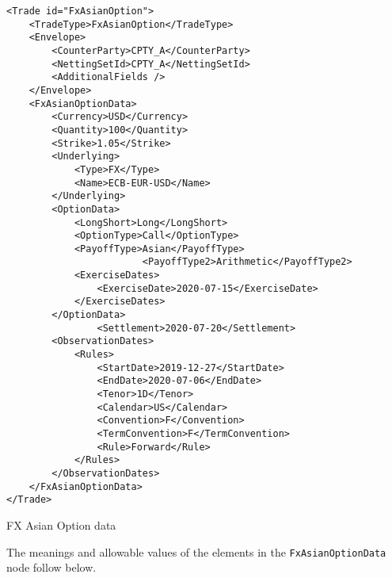 \begin{listing}[H]
	\begin{verbatim}
<Trade id="FxAsianOption">
	<TradeType>FxAsianOption</TradeType>
	<Envelope>
		<CounterParty>CPTY_A</CounterParty>
		<NettingSetId>CPTY_A</NettingSetId>
		<AdditionalFields />
	</Envelope>
	<FxAsianOptionData>
		<Currency>USD</Currency>
		<Quantity>100</Quantity>
		<Strike>1.05</Strike>
		<Underlying>
			<Type>FX</Type>
			<Name>ECB-EUR-USD</Name>
		</Underlying>
		<OptionData>
			<LongShort>Long</LongShort>
			<OptionType>Call</OptionType>
			<PayoffType>Asian</PayoffType>
                        <PayoffType2>Arithmetic</PayoffType2>
			<ExerciseDates>
				<ExerciseDate>2020-07-15</ExerciseDate>
			</ExerciseDates>
		</OptionData>
                <Settlement>2020-07-20</Settlement>
		<ObservationDates>
			<Rules>
				<StartDate>2019-12-27</StartDate>
				<EndDate>2020-07-06</EndDate>
				<Tenor>1D</Tenor>
				<Calendar>US</Calendar>
				<Convention>F</Convention>
				<TermConvention>F</TermConvention>
				<Rule>Forward</Rule>
			</Rules>
		</ObservationDates>
	</FxAsianOptionData>
</Trade>
\end{verbatim}
\caption{FX Asian Option data}
\label{lst:fxasianoption_data}
\end{listing}

The meanings and allowable values of the elements in the \lstinline!FxAsianOptionData!  node follow below.

